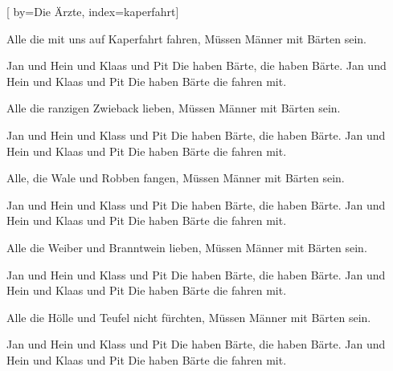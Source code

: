 
[%
    by={Die \"{A}rzte},
    index={kaperfahrt}]


    \label{kaperfahrt}

    \beginverse
        Alle die mit uns auf Kaperfahrt fahren,
        M\"{u}ssen M\"{a}nner mit B\"{a}rten sein.
    \endverse

    \beginchorus
        Jan und Hein und Klaas und Pit
        Die haben B\"{a}rte, die haben B\"{a}rte.
        Jan und Hein und Klaas und Pit
        Die haben B\"{a}rte die fahren mit.
    \endchorus

    \beginverse
        Alle die ranzigen Zwieback lieben,
        M\"{u}ssen M\"{a}nner mit B\"{a}rten sein.
    \endverse

    \beginchorus
        Jan und Hein und Klass und Pit
        Die haben B\"{a}rte, die haben B\"{a}rte.
        Jan und Hein und Klaas und Pit
        Die haben B\"{a}rte die fahren mit.
    \endchorus

    \beginverse
        Alle, die Wale und Robben fangen,
        M\"{u}ssen M\"{a}nner mit B\"{a}rten sein.
    \endverse

    \beginchorus
        Jan und Hein und Klass und Pit
        Die haben B\"{a}rte, die haben B\"{a}rte.
        Jan und Hein und Klaas und Pit
        Die haben B\"{a}rte die fahren mit.
    \endchorus

    \beginverse
        Alle die Weiber und Branntwein lieben,
        M\"{u}ssen M\"{a}nner mit B\"{a}rten sein.
    \endverse

    \beginchorus
        Jan und Hein und Klass und Pit
        Die haben B\"{a}rte, die haben B\"{a}rte.
        Jan und Hein und Klaas und Pit
        Die haben B\"{a}rte die fahren mit.
    \endchorus

    \beginverse
        Alle die H\"{o}lle und Teufel nicht f\"{u}rchten,
        M\"{u}ssen M\"{a}nner mit B\"{a}rten sein.
    \endverse

    \beginchorus
        Jan und Hein und Klass und Pit
        Die haben B\"{a}rte, die haben B\"{a}rte.
        Jan und Hein und Klaas und Pit
        Die haben B\"{a}rte die fahren mit.
    \endchorus
\endsong
